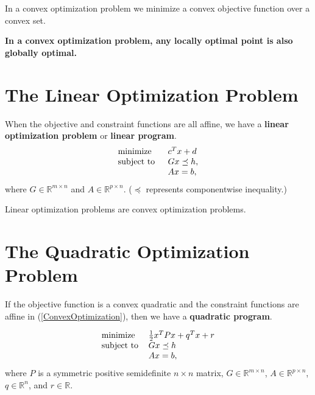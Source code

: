 \documentclass[11pt]{article}
\begin{document}
In a convex optimization problem we minimize a convex objective function over a convex set.

\textbf{In a convex optimization problem, any {\color{tiananmen}\textbf{locally optimal point}} is also {\color{tiananmen}\textbf{globally optimal}}.}

\section*{The Linear Optimization Problem}

When the objective and constraint functions are all affine, we have a {\color{tiananmen}\textbf{linear optimization problem}} or {\color{tiananmen}\textbf{linear program}}.
{\color{baystate}
	\begin{equation}
		\begin{tabular}{ll}
			\text{minimize }   & $c^Tx+d$       \\
			\text{subject to } & $Gx\preceq h$, \\
			& $Ax=b,$      
		\end{tabular}\label{LinearOptimization}
	\end{equation}
where $G\in\mathbb{R}^{m\times n}$ and $A\in\mathbb{R}^{p\times n}$.} ($\preceq$ represents componentwise inequality.)

Linear optimization problems are convex optimization problems.


\section*{The Quadratic Optimization Problem}

If the objective function is a convex quadratic and the constraint functions are affine in (\ref{ConvexOptimization}), then we have a {\color{tiananmen}\textbf{quadratic program}}.

{\color{baystate}
	\begin{equation}
		\begin{tabular}{ll}
			\text{minimize} & $\frac{1}{2}x^TPx+q^Tx+r$ \\
			\text{subject to} & $Gx\preceq h$\\
			& $Ax=b,$
		\end{tabular}\label{QuadraticOptimization}
	\end{equation}
where $P$ is a symmetric positive semidefinite $n\times n$ matrix, $G\in\mathbb{R}^{m\times n}$,  $A\in\mathbb{R}^{p\times n}$, $q\in\mathbb{R}^n$, and $r\in\mathbb{R}$}.
\end{document}
